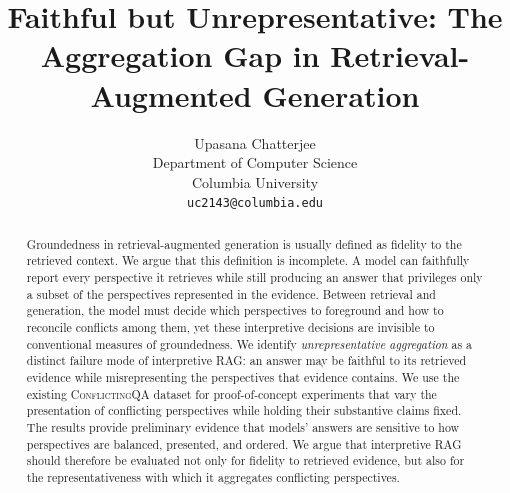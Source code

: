 \documentclass[11pt]{article}
\title{Faithful but Unrepresentative: The Aggregation Gap in Retrieval-Augmented Generation}
\author{Upasana Chatterjee \\
Department of Computer Science \\
  Columbia University \\
  \texttt{uc2143@columbia.edu}}
\begin{document}
\maketitle
\begin{abstract}
Groundedness in retrieval-augmented generation is usually defined as fidelity to the retrieved context. We argue that this definition is incomplete. A model can faithfully report every perspective it retrieves while still producing an answer that privileges only a subset of the perspectives represented in the evidence. Between retrieval and generation, the model must decide which perspectives to foreground and how to reconcile conflicts among them, yet these interpretive decisions are invisible to conventional measures of groundedness. We identify \emph{unrepresentative aggregation} as a distinct failure mode of interpretive RAG: an answer may be faithful to its retrieved evidence while misrepresenting the perspectives that evidence contains. We use the existing \textsc{ConflictingQA} dataset \citep{wan-etal-2024-evidence} for proof-of-concept experiments that vary the presentation of conflicting perspectives while holding their substantive claims fixed. The results provide preliminary evidence that models' answers are sensitive to how perspectives are balanced, presented, and ordered. We argue that interpretive RAG should therefore be evaluated not only for fidelity to retrieved evidence, but also for the representativeness with which it aggregates conflicting perspectives.
\end{abstract}













\appendix

\end{document}
